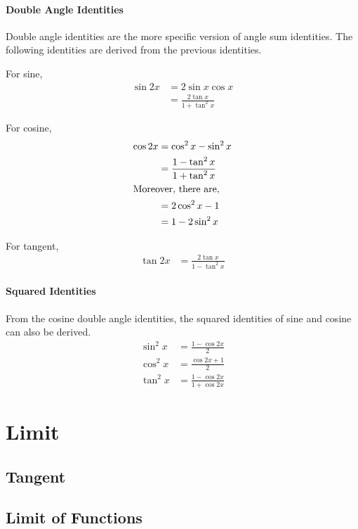 \documentclass{note}
\begin{document}
\subsubsection{Double Angle Identities}

Double angle identities are the more specific version of angle sum identities. The following identities are derived from the previous identities.

For sine,
\begin{align*}
    \sin 2x & = 2 \sin x \cos x \\
            & = \frac{2 \tan x}{1 + \tan^2 x}
\end{align*}

For cosine,
\begin{align*}
    \cos 2x & = \cos^2 x - \sin^2 x \\
            & = \frac{1 - \tan^2 x}{1 + \tan^2 x} \\
    \shortintertext{Moreover, there are, }
            & = 2\cos^2 x - 1 \\
            & = 1 - 2\sin^2 x \\
\end{align*}

For tangent, 
\begin{align*}
    \tan 2x & = \frac{2 \tan x}{1 - \tan^2 x}
\end{align*}

\subsubsection{Squared Identities}

From the cosine double angle identities, the squared identities of sine and cosine can also be derived.
\begin{align*}
    \sin^2 x & = \frac{1 - \cos 2x}{2} \\
    \cos^2 x & = \frac{\cos 2x + 1}{2} \\
    \tan^2 x & = \frac{1 - \cos 2x}{1 + \cos2x} 
\end{align*}

\chapter{Limit}
\section{Tangent}
\section{Limit of Functions}
\end{document}

